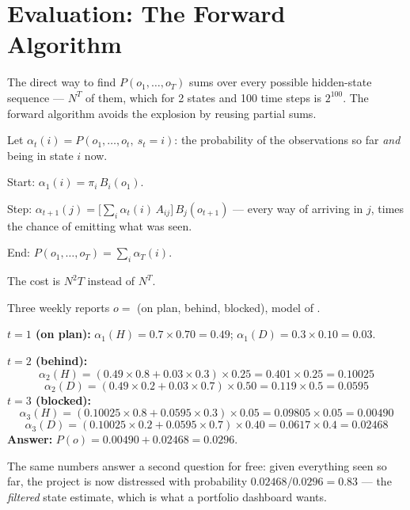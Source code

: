 \section{Evaluation: The Forward Algorithm}

The direct way to find $P(o_1, \dots, o_T)$ sums over every possible hidden-state
sequence --- $N^T$ of them, which for 2 states and 100 time steps is $2^{100}$. The
forward algorithm avoids the explosion by reusing partial sums.

\begin{definitionbox}
Let $\alpha_t(i) = P(o_1, \dots, o_t,\ s_t = i)$: the probability of the observations
so far \emph{and} being in state $i$ now.
\begin{tight}
  \item Start: $\alpha_1(i) = \pi_i\,B_i(o_1)$.
  \item Step: $\alpha_{t+1}(j) = \Big[\sum_i \alpha_t(i)\,A_{ij}\Big]\,B_j(o_{t+1})$
        --- every way of arriving in $j$, times the chance of emitting what was seen.
  \item End: $P(o_1, \dots, o_T) = \sum_i \alpha_T(i)$.
\end{tight}
The cost is $N^2 T$ instead of $N^T$.
\end{definitionbox}

\begin{worked}
Three weekly reports $o = $ (on plan, behind, blocked), model of .

\smallskip
\textbf{$t = 1$ (on plan):} $\alpha_1(H) = 0.7 \times 0.70 = 0.49$;
$\alpha_1(D) = 0.3 \times 0.10 = 0.03$.

\textbf{$t = 2$ (behind):}
\[
\alpha_2(H) = (0.49 \times 0.8 + 0.03 \times 0.3) \times 0.25 = 0.401 \times 0.25 = 0.10025
\]
\[
\alpha_2(D) = (0.49 \times 0.2 + 0.03 \times 0.7) \times 0.50 = 0.119 \times 0.5 = 0.0595
\]
\textbf{$t = 3$ (blocked):}
\[
\alpha_3(H) = (0.10025 \times 0.8 + 0.0595 \times 0.3) \times 0.05 = 0.09805 \times 0.05 = 0.00490
\]
\[
\alpha_3(D) = (0.10025 \times 0.2 + 0.0595 \times 0.7) \times 0.40 = 0.0617 \times 0.4 = 0.02468
\]
\textbf{Answer:} $P(o) = 0.00490 + 0.02468 = \mathbf{0.0296}$.

\smallskip
The same numbers answer a second question for free: given everything seen so far,
the project is now distressed with probability $0.02468/0.0296 = \mathbf{0.83}$ ---
the \emph{filtered} state estimate, which is what a portfolio dashboard wants.
\end{worked}

